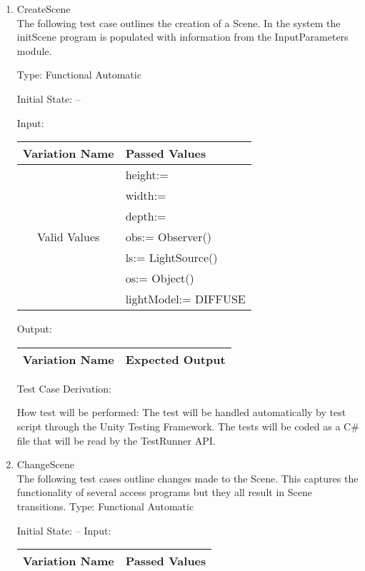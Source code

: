 \documentclass[12pt, titlepage]{article}
\begin{document}
\begin{enumerate}
	
	\item{CreateScene\\}
	The following test case outlines the creation of a Scene. In the system the 
	initScene program is populated with information from the InputParameters 
	module.
	
	Type: Functional Automatic
	
	Initial State: --
	
	Input: 
	\begin{tabular}{|c|p{8cm}|}
		\hline
		\textbf{Variation Name} & \textbf{Passed Values}\\
		\hline
		\multirow{7}{*}{Valid Values} & height:= \\
		& width:= \\
		& depth:= \\
		& obs:= Observer() \\
		& ls:= LightSource() \\
		& os:= Object()\\
		& lightModel:= DIFFUSE \\
		\hline
	\end{tabular}
	
	Output: 
	\begin{tabular}{|c|c|}
		\hline
		\textbf{Variation Name} & \textbf{Expected Output}\\
		\hline
		
		\hline
	\end{tabular}
	
	Test Case Derivation: 
	
	How test will be performed: The test will be handled automatically by test 
	script through the Unity Testing Framework. The tests will be coded as a 
	C\# file that will be read by the TestRunner API.
	
	\item{ChangeScene\\}
	The following test cases outline changes made to the Scene. This captures 
	the functionality of several access programs but they all result in Scene 
	transitions.
	Type: Functional Automatic
	
	Initial State: --
	Input: 
	\begin{tabular}{|c|c|}
		\hline
		\textbf{Variation Name} & \textbf{Passed Values}\\
		\hline
		

\end{tabular}
\end{enumerate}
\end{document}
